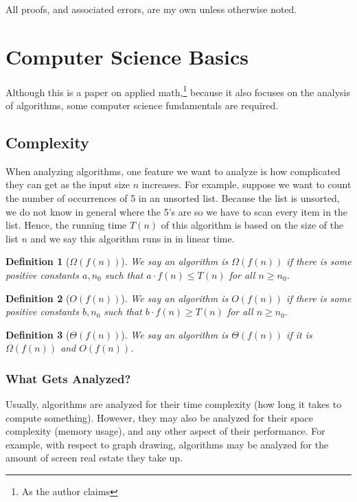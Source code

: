 \documentclass[11pt]{report}
\newtheorem{defn}{Definition}[section]
\begin{document}
\bigskip

All proofs, and associated errors, are my own unless otherwise noted.

\section{Computer Science Basics}
Although this is a paper on applied math,\footnote{As the author claims} because it also focuses on the analysis of algorithms, some computer science fundamentals are required.
 
\subsection{Complexity}
When analyzing algorithms, one feature we want to analyze is how complicated they can get as the input size $n$ increases. For example, suppose we want to count the number of occurrences of 5 in an unsorted list. Because the list is unsorted, we do not know in general where the 5's are so we have to scan every item in the list. Hence, the running time $T(n)$ of this algorithm is based on the size of the list $n$ and we say this algorithm runs in in linear time.

\begin{defn}[$\Omega(f(n))$] We say an algorithm is $\Omega(f(n))$ if there is some positive constants $a, n_0$ such that $a \cdot f(n) \leq T(n)$ for all $n \geq n_0$.
\end{defn}

\begin{defn}[$O(f(n))$] We say an algorithm is $O(f(n))$ if there is some positive constants $b, n_0$ such that $b \cdot f(n) \geq T(n)$ for all $n \geq n_0$.
\end{defn}

\begin{defn}[$\Theta(f(n))$] We say an algorithm is $\Theta(f(n))$ if it is $\Omega(f(n))$ and $O(f(n))$.
\end{defn}

\subsubsection{What Gets Analyzed?}
Usually, algorithms are analyzed for their time complexity (how long it takes to compute something). However, they may also be analyzed for their space complexity (memory usage), and any other aspect of their performance. For example, with respect to graph drawing, algorithms may be analyzed for the amount of screen real estate they take up.
\end{document}
